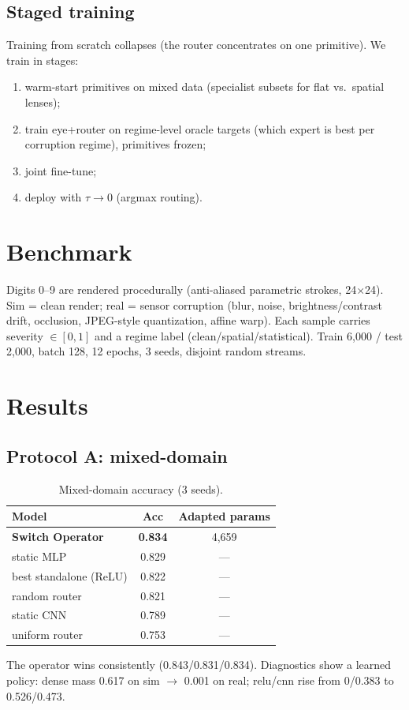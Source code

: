 \documentclass[conference,10pt]{IEEEtran}
\begin{document}
\subsection{Staged training}
Training from scratch collapses (the router concentrates on one primitive). We train in stages:
\begin{enumerate}
\item warm-start primitives on mixed data (specialist subsets for flat vs.\ spatial lenses);
\item train eye+router on regime-level oracle targets (which expert is best per corruption regime), primitives frozen;
\item joint fine-tune;
\item deploy with $\tau\to0$ (argmax routing).
\end{enumerate}

\section{Benchmark}
Digits 0--9 are rendered procedurally (anti-aliased parametric strokes, 24$\times$24). Sim = clean render; real = sensor corruption (blur, noise, brightness/contrast drift, occlusion, JPEG-style quantization, affine warp). Each sample carries severity $\in[0,1]$ and a regime label (clean/spatial/statistical). Train 6{,}000 / test 2{,}000, batch 128, 12 epochs, 3 seeds, disjoint random streams.

\section{Results}
\subsection{Protocol A: mixed-domain}\label{sec:A}
\begin{table}[h]
\centering
\caption{Mixed-domain accuracy (3 seeds).}
\label{tab:a}
\begin{tabular}{lcc}
\toprule
Model & Acc & Adapted params\\
\midrule
\textbf{Switch Operator} & \textbf{0.834} & 4{,}659\\
static MLP & 0.829 & ---\\
best standalone (ReLU) & 0.822 & ---\\
random router & 0.821 & ---\\
static CNN & 0.789 & ---\\
uniform router & 0.753 & ---\\
\bottomrule
\end{tabular}
\end{table}
The operator wins consistently (0.843/0.831/0.834). Diagnostics show a learned policy: dense mass 0.617 on sim $\to$ 0.001 on real; relu/cnn rise from 0/0.383 to 0.526/0.473.
\end{document}
